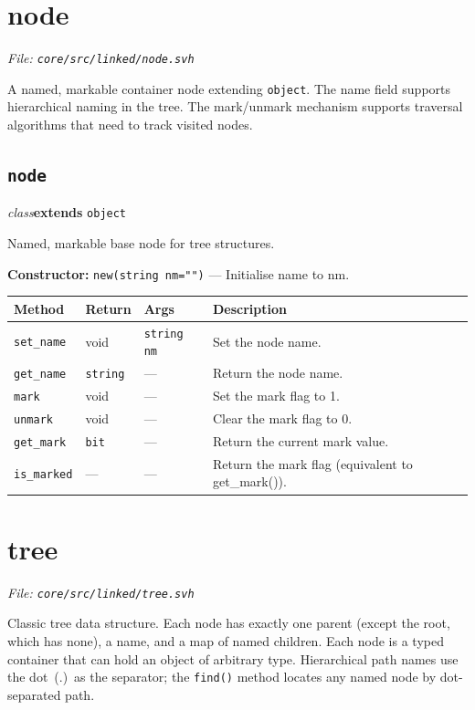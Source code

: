 \documentclass[11pt,letterpaper]{report}
\begin{document}
\section{node}
\noindent\small\textit{File: \texttt{core/src/linked/node.svh}}\par

A named, markable container node extending \texttt{object}. The name field supports hierarchical naming in the tree. The mark/unmark mechanism supports traversal algorithms that need to track visited nodes.

\subsection*{\texttt{node}}
\noindent\small\textit{class}\quad \textbf{extends} \texttt{object}\par

Named, markable base node for tree structures.

\noindent\textbf{Constructor:} \texttt{new(string nm="")} --- Initialise name to nm.

\begin{xltabular}{\linewidth}{>{\small}p{1.35in} >{\small}p{1.25in} >{\small}p{0.95in} >{\small}X}
\toprule
\textbf{Method} & \textbf{Return} & \textbf{Args} & \textbf{Description} \\
\midrule
\endhead
\bottomrule
\endfoot
\texttt{set\_name} & void & \texttt{string nm} & Set the node name. \\
\texttt{get\_name} & \texttt{string} & --- & Return the node name. \\
\texttt{mark} & void & --- & Set the mark flag to 1. \\
\texttt{unmark} & void & --- & Clear the mark flag to 0. \\
\texttt{get\_mark} & \texttt{bit} & --- & Return the current mark value. \\
\texttt{is\_marked} & --- & --- & Return the mark flag (equivalent to get\_mark()). \\
\end{xltabular}

\section{tree}
\noindent\small\textit{File: \texttt{core/src/linked/tree.svh}}\par

Classic tree data structure. Each node has exactly one parent (except the root, which has none), a name, and a map of named children. Each node is a typed container that can hold an object of arbitrary type. Hierarchical path names use the dot~(.)~as the separator; the \texttt{find()} method locates any named node by dot-separated path.
\end{document}

